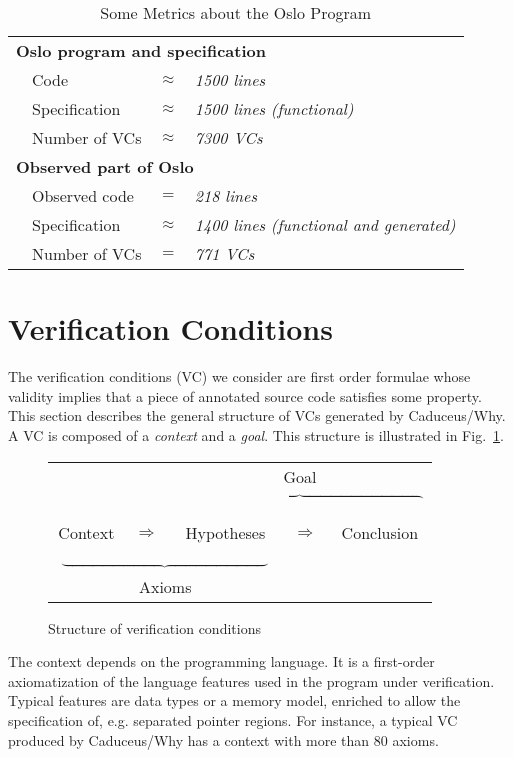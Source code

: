 \documentclass{acm_proc_article-sp}
\theoremstyle{nonumberplain}
\begin{document}
\begin{table}[bht!]

    \begin{tabular}{@{~}l@{~~}l@{~}l@{~}l@{}}
      \multicolumn{4}{l}{\bf Oslo program and specification}\\
      &Code          &$\approx$&\it 1500 lines \\
      &Specification &$\approx$&\it 1500 lines (functional)\\
      &Number of VCs &$\approx$&\it 7300 VCs\\
      \multicolumn{4}{l}{\bf Observed part of Oslo}\\
      &Observed code &$=$&\it       218 lines\\
      &Specification &$\approx$&\it 1400 lines (functional and generated)\\ 
      &Number of VCs &$=$&\it       771 VCs\\
    \end{tabular}

  \caption{Some Metrics about the Oslo Program}
  \label{tab:oslo}
\end{table}

\section{Verification Conditions}\label{sec:vcnf}
The verification conditions (VC) we consider are first order formulae
whose validity implies that a piece of annotated source code satisfies
some property. This section describes the general structure of VCs
generated by Cadu\-ceus/Why. A VC is composed of a \emph{context} and a
\emph{goal}. This structure is illustrated in Fig.~\ref{fig:vc}.


\begin{figure}[hbt!]
\begin{center}
\begin{tabular}{ccccc}
&  & \multicolumn{3}{c}{Goal} \\
&  & \multicolumn{3}{c}{$\overbrace{\phantom{Accolade horizontale 
vers le bas space}}$} \\
Context & $\Rightarrow$ & Hypotheses & $\Rightarrow$ & Conclusion \\
\multicolumn{3}{c}{$\underbrace{\phantom{Accolade horizontale vers 
haut}}$} \\ \multicolumn{3}{c}{Axioms}
\end{tabular}
\end{center}
\caption{Structure of verification conditions \label{fig:vc}}
\end{figure}
The context depends on the programming language. It is a first-order
axiomatization of the language features used in the program under
verification. Typical features are data types or a memory model,
enriched to allow the specification of, e.g. separated pointer regions.
For instance, a typical VC produced by Caduceus/Why has a context with
more than 80 axioms.
\end{document}
